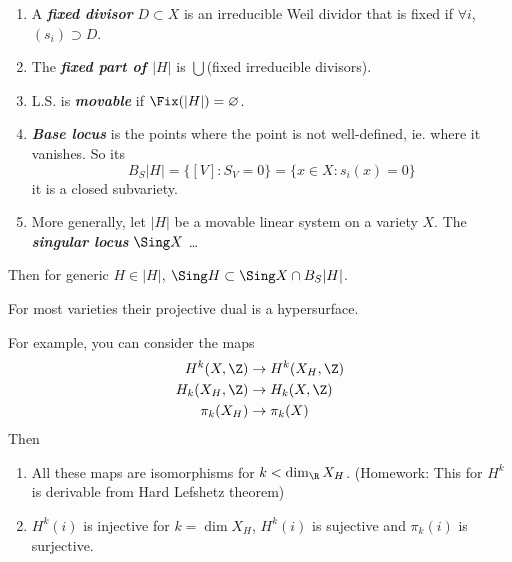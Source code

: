 \begin{defn}\leavevmode
	\begin{enumerate}
		\item A \textbf{\textit{fixed divisor}} $D\subset X$ is an irreducible Weil dividor that is fixed if $\forall i$, $(s_i)\supset D$.
	
		\item The \textbf{\textit{fixed part of $|H|$}} is  $\bigcup$(fixed irreducible divisors).
		
		\item L.S. is \textbf{\textit{movable}} if $\Fix(|H|)=\varnothing$.
		
		\item \textbf{\textit{Base locus}} is the points where the point is not well-defined, ie. where it vanishes. So its \[B_S|H|=\{[V]:S_V=0\}=\{x\in X:s_i(x)=0\}\]
		it is a closed subvariety.
		
		\item More generally, let $|H|$ be a movable linear system on a variety $X$. The \textbf{\textit{singular locus}} $\Sing X$ …
	\end{enumerate}
\end{defn}
\begin{thm}
	Then for generic $H\in|H|$, $\Sing H\subset\Sing X\cap B_S|H|$.
\end{thm}
For most varieties their projective dual is a hypersurface.
\begin{thm}[Lefshetz]
	For example, you can consider the maps
	\begin{align*}
		H^k(X,\Z)&\to H^k(X_H,\Z)\\
		H_k(X_H,\Z)&\to H_k(X,\Z)\\
		\pi_k(X_H)&\to\pi_k(X)
	\end{align*}
	Then
	\begin{enumerate}
		\item All these maps are isomorphisms for $k<\dim_{\R}X_H$. {\color{magenta}(Homework: This for $H^k$ is derivable from Hard Lefshetz theorem)}
		\item $H^k(i)$ is injective for $k=\dim X_H$, $H^k(i)$ is sujective and $\pi_k(i)$ is surjective.
	\end{enumerate}
\end{thm}



